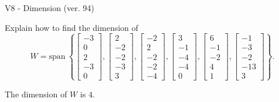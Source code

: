 \begin{exercise}
  \begin{exerciseTitle}V8 - Dimension (ver. 94)\end{exerciseTitle}
  \begin{exerciseStatement}
    Explain how to find the dimension of 
\[W=\mathrm{span}\ \left\{\left[\begin{array}{r}
-3 \\
0 \\
2 \\
-3 \\
0
\end{array}\right] , \left[\begin{array}{r}
2 \\
-2 \\
-2 \\
-3 \\
3
\end{array}\right] , \left[\begin{array}{r}
-2 \\
2 \\
-2 \\
-2 \\
-4
\end{array}\right] , \left[\begin{array}{r}
3 \\
-1 \\
-4 \\
-4 \\
0
\end{array}\right] , \left[\begin{array}{r}
6 \\
-1 \\
-2 \\
4 \\
1
\end{array}\right] , \left[\begin{array}{r}
-1 \\
-3 \\
-2 \\
-13 \\
3
\end{array}\right]\right\}.\]



  \end{exerciseStatement}
  \begin{exerciseAnswer}
   The dimension of \(W\) is  \(4\).
  


  \end{exerciseAnswer}
\end{exercise}